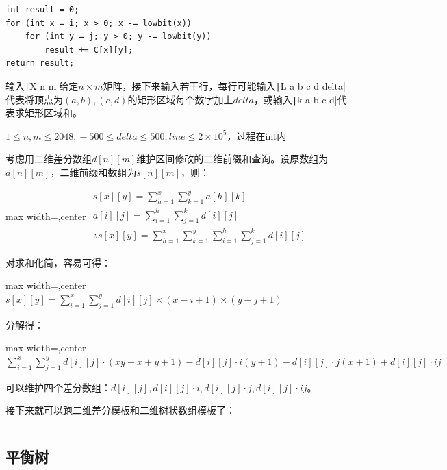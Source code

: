 \documentclass[twocolumn,10pt]{ctexart}
\begin{document}
\begin{verbatim}
int result = 0;
for (int x = i; x > 0; x -= lowbit(x))
    for (int y = j; y > 0; y -= lowbit(y))
        result += C[x][y];
return result;
\end{verbatim}

\begin{notebox}
输入\texttt|X n m|给定$n\times m$矩阵，接下来输入若干行，每行可能输入\texttt|L a b c d delta|代表将顶点为$(a,b),(c,d)$的矩形区域每个数字加上$delta$，或输入\texttt|k a b c d|代表求矩形区域和。

$1\le n,\allowbreak{}m\le2048,\allowbreak{}-500\le delta\le500,\allowbreak{}line\le2\times10^5$，过程在int内
\end{notebox}

考虑用二维差分数组$d[n][m]$维护区间修改的二维前缀和查询。设原数组为$a[n][m]$，二维前缀和数组为$s[n][m]$，则：

\begin{adjustbox}{max width=\linewidth,center}
$\begin{gathered}
s[x][y]=\sum_{h=1}^x\sum_{k=1}^ya[h][k]\\
a[i][j]=\sum_{i=1}^h\sum_{j=1}^kd[i][j]\\
\therefore s[x][y]=\sum_{h=1}^x\sum_{k=1}^y\sum_{i=1}^h\sum_{j=1}^kd[i][j]
\end{gathered}$
\end{adjustbox}

对求和化简，容易可得：

\begin{adjustbox}{max width=\linewidth,center}
$s[x][y]=\sum_{i=1}^x\sum_{j=1}^yd[i][j]\times(x-i+1)\times(y-j+1)$
\end{adjustbox}

分解得：

\begin{adjustbox}{max width=\linewidth,center}
$\sum_{i=1}^x\sum_{j=1}^yd[i][j]\cdot(xy+x+y+1)-d[i][j]\cdot i(y+1)-d[i][j]\cdot j(x+1)+d[i][j]\cdot ij$
\end{adjustbox}

可以维护四个差分数组：$d[i][j],\allowbreak{}d[i][j]\cdot i,\allowbreak{}d[i][j]\cdot j,\allowbreak{}d[i][j]\cdot ij$。

接下来就可以跑二维差分模板和二维树状数组模板了：

\inputminted{cpp}{code/p4514_2dim_fenwick.cpp}

\subsection{平衡树}
\end{document}
